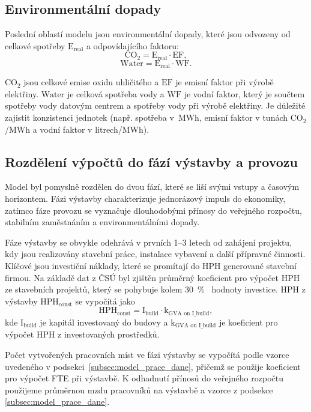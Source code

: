 \subsection{Environmentální dopady}
\label{subsec:model_enviro}

Poslední oblastí modelu jsou environmentální dopady, které jsou odvozeny od celkové spotřeby $\text{E}_\text{real}$ a odpovídajícího faktoru:
$$\text{CO}_2 = \text{E}_\text{real} \cdot \text{EF},$$
$$\text{Water} = \text{E}_\text{real} \cdot \text{WF}.$$

$\text{CO}_2$ jsou celkové emise oxidu uhličitého a $\text{EF}$ je emisní faktor při výrobě elektřiny. $\text{Water}$ je celková spotřeba vody a $\text{WF}$ je vodní faktor, který je součtem spotřeby vody datovým centrem a spotřeby vody při výrobě elektřiny. Je důležité zajistit konzistenci jednotek (např. spotřeba v~MWh, emisní faktor v tunách CO$_2$/MWh a vodní faktor v litrech/MWh).

\subsection{Rozdělení výpočtů do fází výstavby a provozu}
\label{subsec:model_faze}

Model byl pomyslně rozdělen do dvou fází, které se liší svými vstupy a časovým horizontem. Fázi výstavby charakterizuje jednorázový impuls do ekonomiky, zatímco fáze provozu se vyznačuje dlouhodobými přínosy do veřejného rozpočtu, stabilním zaměstnáním a environmentálními dopady.

Fáze výstavby se obvykle odehrává v prvních 1--3 letech od zahájení projektu, kdy jsou realizovány stavební práce, instalace vybavení a další přípravné činnosti. Klíčové jsou investiční náklady, které se promítají do HPH generované stavební firmou. Na základě dat z ČSÚ byl zjištěn průměrný koeficient pro výpočet HPH ze stavebních projektů, který se pohybuje kolem 30~\%~\cite{csu_mezispotreba_2026,csu_produkce_2026} hodnoty investice. HPH z výstavby $\text{HPH}_{\text{const}}$ se vypočítá jako
$$\text{HPH}_{\text{const}} = \text{I}_{\text{build}} \cdot \text{k}_{\text{GVA on I\_build}},$$
kde $\text{I}_{\text{build}}$ je kapitál investovaný do budovy a $\text{k}_{\text{GVA on I\_build}}$ je koeficient pro výpočet HPH z investovaných prostředků.

Počet vytvořených pracovních míst ve fázi výstavby se vypočítá podle vzorce uvedeného v podsekci~\ref{subsec:model_prace_dane}, přičemž se použije koeficient pro výpočet FTE při výstavbě. K odhadnutí přínosů do veřejného rozpočtu použijeme průměrnou mzdu pracovníků na výstavbě a vzorce z podsekce \ref{subsec:model_prace_dane}.

